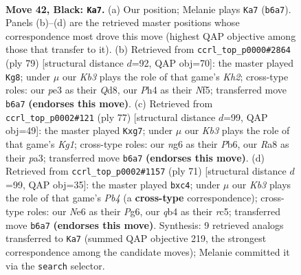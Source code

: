 \documentclass[11pt]{article}
\begin{document}
\clearpage

\begin{figure}[p]\centering
\begin{subfigure}{0.46\textwidth}\centering
\resizebox{\linewidth}{!}{%
\newchessgame
\chessboard[
  setfen={r7/1p4p1/pkB1npN1/8/1Q1R3p/4P1P1/PPR2P1P/7K b - - 4 42},
  showmover=false,
  pgfstyle=straightmove, color=movearrow, markmove={b6-a7}
]}
\caption{}
\end{subfigure}\hfill
\begin{subfigure}{0.46\textwidth}\centering
\resizebox{\linewidth}{!}{%
\newchessgame
\chessboard[
  setfen={2rq4/5ppk/p3p3/1p3nRQ/5P1P/P1B5/1PP5/1K6 b - - 14 40},
  showmover=false,
  pgfstyle=straightmove, color=movearrow, markmove={h7-g8}
]}
\caption{}
\end{subfigure}
\\[4pt]
\begin{subfigure}{0.46\textwidth}\centering
\resizebox{\linewidth}{!}{%
\newchessgame
\chessboard[
  setfen={3r2k1/p2n1pQp/1p1P4/5p1p/2B2P2/P3R1P1/1P4K1/8 b - - 0 39},
  showmover=false,
  pgfstyle=straightmove, color=movearrow, markmove={g8-g7}
]}
\caption{}
\end{subfigure}\hfill
\begin{subfigure}{0.46\textwidth}\centering
\resizebox{\linewidth}{!}{%
\newchessgame
\chessboard[
  setfen={1r4k1/5p2/4r1p1/1pRp3p/1PB1P3/R4P1P/6P1/7K b - - 0 36},
  showmover=false,
  pgfstyle=straightmove, color=movearrow, markmove={b5-c4}
]}
\caption{}
\end{subfigure}
\caption{\textbf{Move 42, Black: \texttt{Ka7}.} (a) Our position; Melanie plays \texttt{Ka7} (\texttt{b6a7}). Panels (b)--(d) are the retrieved master positions whose correspondence most drove this move (highest QAP objective among those that transfer to it). (b) Retrieved from \texttt{ccrl\_top\_p0000\#2864} (ply 79) [structural distance $d$=92, QAP obj=70]: the master played \texttt{Kg8}; under $\mu$ our \emph{Kb3} plays the role of that game's \emph{Kh2}; cross-type roles: our \emph{p}e3 as their \emph{Q}d8, our \emph{P}h4 as their \emph{N}f5; transferred move \texttt{b6a7} \textbf{(endorses this move)}. (c) Retrieved from \texttt{ccrl\_top\_p0002\#121} (ply 77) [structural distance $d$=99, QAP obj=49]: the master played \texttt{Kxg7}; under $\mu$ our \emph{Kb3} plays the role of that game's \emph{Kg1}; cross-type roles: our \emph{n}g6 as their \emph{P}b6, our \emph{R}a8 as their \emph{p}a3; transferred move \texttt{b6a7} \textbf{(endorses this move)}. (d) Retrieved from \texttt{ccrl\_top\_p0002\#1157} (ply 71) [structural distance $d$=99, QAP obj=35]: the master played \texttt{bxc4}; under $\mu$ our \emph{Kb3} plays the role of that game's \emph{Pb4} (a \textbf{cross-type} correspondence); cross-type roles: our \emph{N}e6 as their \emph{P}g6, our \emph{q}b4 as their \emph{r}c5; transferred move \texttt{b6a7} \textbf{(endorses this move)}. Synthesis: 9 retrieved analogs transferred to \texttt{Ka7} (summed QAP objective 219, the strongest correspondence among the candidate moves); Melanie committed it via the \texttt{search} selector.}
\label{fig:thought-m83}
\end{figure}
\end{document}
